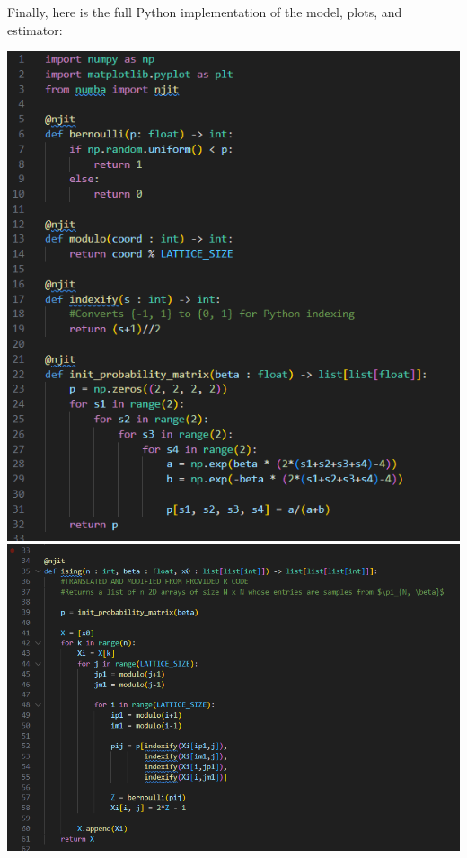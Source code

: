 \documentclass[11pt,letterpaper, leqno]{article}
\numberwithin{equation}{section}
\numberwithin{theorem}{section}
\numberwithin{lemma}{section}
\numberwithin{corollary}{section}
\numberwithin{definition}{section}
\numberwithin{proposition}{section}
\numberwithin{remark}{section}
\numberwithin{example}{section}
\begin{document}
        \pagebreak
        
        Finally, here is the full Python implementation of the model, plots, and estimator:
        
        \begin{center}
            \includegraphics[width=\textwidth]{Images/Code 1 - Helper.png}
            \includegraphics[width=\textwidth]{Images/Code 2 - Ising.png}

\end{center}
\end{document}
